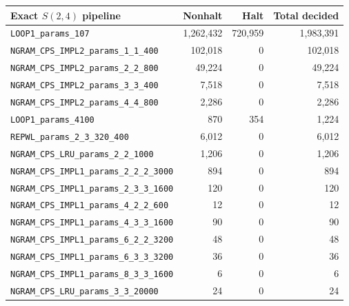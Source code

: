 \documentclass[a4paper,british]{article}
\theoremstyle{definition} %
\numberwithin{equation}{section}
\theoremstyle{definition} %
\begin{document}
\begin{table}[h!]
    \centering
    \scriptsize
    \begin{tabular}{|lrrr|}
        \hline
        Exact $S(2,4)$ pipeline                           & Nonhalt       & Halt      & Total decided \\
        \hline
        \texttt{LOOP1\_params\_107}                       & 1{,}262{,}432 & 720{,}959 & 1{,}983{,}391 \\
        \texttt{NGRAM\_CPS\_IMPL2\_params\_1\_1\_400}     & 102{,}018     & 0         & 102{,}018     \\
        \texttt{NGRAM\_CPS\_IMPL2\_params\_2\_2\_800}     & 49{,}224      & 0         & 49{,}224      \\
        \texttt{NGRAM\_CPS\_IMPL2\_params\_3\_3\_400}     & 7{,}518       & 0         & 7{,}518       \\
        \texttt{NGRAM\_CPS\_IMPL2\_params\_4\_4\_800}     & 2{,}286       & 0         & 2{,}286       \\
        \texttt{LOOP1\_params\_4100}                      & 870           & 354       & 1{,}224       \\
        \texttt{REPWL\_params\_2\_3\_320\_400}            & 6{,}012       & 0         & 6{,}012       \\
        \texttt{NGRAM\_CPS\_LRU\_params\_2\_2\_1000}      & 1{,}206       & 0         & 1{,}206       \\
        \texttt{NGRAM\_CPS\_IMPL1\_params\_2\_2\_2\_3000} & 894           & 0         & 894           \\
        \texttt{NGRAM\_CPS\_IMPL1\_params\_2\_3\_3\_1600} & 120           & 0         & 120           \\
        \texttt{NGRAM\_CPS\_IMPL1\_params\_4\_2\_2\_600}  & 12            & 0         & 12            \\
        \texttt{NGRAM\_CPS\_IMPL1\_params\_4\_3\_3\_1600} & 90            & 0         & 90            \\
        \texttt{NGRAM\_CPS\_IMPL1\_params\_6\_2\_2\_3200} & 48            & 0         & 48            \\
        \texttt{NGRAM\_CPS\_IMPL1\_params\_6\_3\_3\_3200} & 36            & 0         & 36            \\
        \texttt{NGRAM\_CPS\_IMPL1\_params\_8\_3\_3\_1600} & 6             & 0         & 6             \\
        \texttt{NGRAM\_CPS\_LRU\_params\_3\_3\_20000}     & 24            & 0         & 24            \\

\end{tabular}
\end{table}
\end{document}

